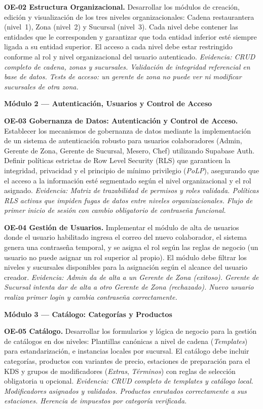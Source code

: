 \noindent\textbf{OE-02 Estructura Organizacional.}
Desarrollar los módulos de creación, edición y visualización de los tres niveles
organizacionales: Cadena restaurantera (nivel~1), Zona (nivel~2) y Sucursal
(nivel~3). Cada nivel debe contener las entidades que le corresponden y garantizar
que toda entidad inferior esté siempre ligada a su entidad superior. El acceso a
cada nivel debe estar restringido conforme al rol y nivel organizacional del usuario
autenticado.
\textit{Evidencia: CRUD completo de cadena, zonas y sucursales. Validación de
integridad referencial en base de datos. Tests de acceso: un gerente de zona no
puede ver ni modificar sucursales de otra zona.}

\noindent\textbf{Módulo 2 — Autenticación, Usuarios y Control de Acceso}

\noindent\textbf{OE-03 Gobernanza de Datos: Autenticación y Control de Acceso.}
Establecer los mecanismos de gobernanza de datos mediante la implementación de un
sistema de autenticación robusto para usuarios colaboradores (Admin, Gerente de
Zona, Gerente de Sucursal, Mesero, Chef) utilizando Supabase Auth. Definir
políticas estrictas de Row Level Security (RLS) que garanticen la integridad,
privacidad y el principio de mínimo privilegio (\textit{PoLP}), asegurando que el
acceso a la información esté segmentado según el nivel organizacional y el rol
asignado.
\textit{Evidencia: Matriz de trazabilidad de permisos y roles validada. Políticas
RLS activas que impiden fugas de datos entre niveles organizacionales. Flujo de
primer inicio de sesión con cambio obligatorio de contraseña funcional.}

\noindent\textbf{OE-04 Gestión de Usuarios.}
Implementar el módulo de alta de usuarios donde el usuario habilitado ingresa el
correo del nuevo colaborador, el sistema genera una contraseña temporal, y se asigna
el rol según las reglas de negocio (un usuario no puede asignar un rol superior al
propio). El módulo debe filtrar los niveles y sucursales disponibles para la
asignación según el alcance del usuario creador.
\textit{Evidencia: Admin da de alta a un Gerente de Zona (exitoso). Gerente de
Sucursal intenta dar de alta a otro Gerente de Zona (rechazado). Nuevo usuario
realiza primer login y cambia contraseña correctamente.}

\noindent\textbf{Módulo 3 — Catálogo: Categorías y Productos}

\noindent\textbf{OE-05 Catálogo.}
Desarrollar los formularios y lógica de negocio para la gestión de catálogos en dos
niveles: Plantillas canónicas a nivel de cadena (\textit{Templates}) para
estandarización, e instancias locales por sucursal. El catálogo debe incluir
categorías, productos con variantes de precio, estaciones de preparación para el
KDS y grupos de modificadores (\textit{Extras}, \textit{Términos}) con reglas de
selección obligatoria u opcional.
\textit{Evidencia: CRUD completo de templates y catálogo local. Modificadores
asignados y validados. Productos enrutados correctamente a sus estaciones. Herencia
de impuestos por categoría verificada.}

